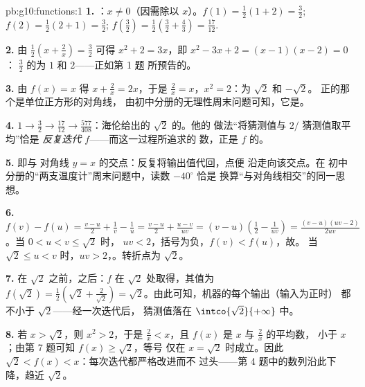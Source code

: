 \begin{solution}{pb:g10:functions:1}
\textbf{1.} ：$x \neq 0$（因需除以 $x$）。$f(1) =
\frac12(1 + 2) = \frac32$; $f(2) = \frac12(2 + 1) = \frac32$;
$f\!\left(\frac32\right) = \frac12\left(\frac32 +
\frac43\right) = \frac{17}{12}$.

\textbf{2.} 由 $\frac12\left(x + \frac2x\right) = \frac32$ 可得
$x^2 + 2 = 3x$，即 $x^2 - 3x + 2 = (x - 1)(x - 2) = 0$：
$\frac32$ 的为 $1$ 和 $2$——正如第 1 题
所预告的。

\textbf{3.} 由 $f(x) = x$ 得 $x + \frac2x = 2x$，于是
$\frac2x = x$，$x^2 = 2$：为 $\sqrt2$ 和 $-\sqrt2$。
正的那个是单位正方形的对角线，
由初中分册的无理性周末问题可知，它是。

\textbf{4.} $1 \to \frac32 \to \frac{17}{12} \to
\frac{577}{408}$：海伦给出的 $\sqrt2$ 的。他的
做法“将猜测值与 $2/$ 猜测值取平均”恰是
\emph{反复迭代 $f$}——而这一过程所追求的
数，正是 $f$ 的。

\textbf{5.} 即与
对角线 $y = x$ 的交点：反复将输出值代回，点便
沿走向该交点。在
初中分册的“两支温度计”周末问题中，读数 $-40^\circ$ 恰是
换算“与对角线相交”的同一思想。

\textbf{6.} $f(v) - f(u) = \frac{v - u}{2} + \frac1v - \frac1u
= \frac{v - u}{2} + \frac{u - v}{uv}
= (v - u)\left(\frac12 - \frac{1}{uv}\right)
= \frac{(v - u)(uv - 2)}{2uv}$。当 $0 < u < v \leq \sqrt2$ 时，
$uv < 2$，括号为负，$f(v) < f(u)$，故。
当 $\sqrt2 \leq u < v$ 时，$uv > 2$，。转折点为
$\sqrt2$。

\textbf{7.} 在 $\sqrt2$ 之前，之后：$f$
在 $\sqrt2$ 处取得，其值为
$f(\sqrt2) = \frac12\left(\sqrt2 + \frac{2}{\sqrt2}\right)
= \sqrt2$。由此可知，机器的每个输出（输入为正时）
都不小于 $\sqrt2$——经一次迭代后，
猜测值落在 $\intco{\sqrt2}{+\infty}$ 中。

\textbf{8.} 若 $x > \sqrt2$，则 $x^2 > 2$，于是
$\frac2x < x$，且 $f(x)$ 是 $x$ 与 $\frac2x$ 的平均数，
小于 $x$；由第 7 题可知 $f(x) \geq \sqrt2$，等号
仅在 $x = \sqrt2$ 时成立。因此
$\sqrt2 < f(x) < x$：每次迭代都严格改进而不
过头——第 4 题中的数列沿此下降，趋近
$\sqrt2$。


\end{solution}
